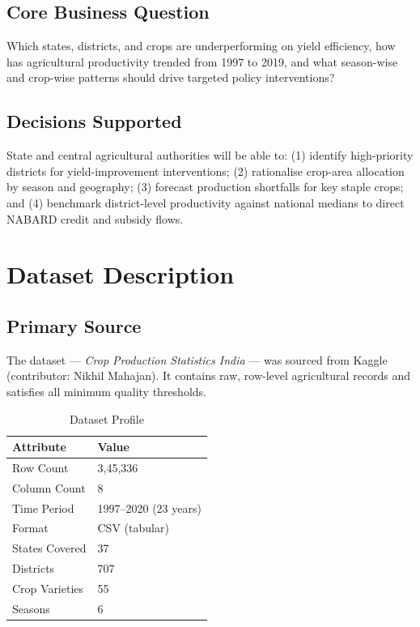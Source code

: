 \documentclass[10pt]{article}
\begin{document}
\subsection{Core Business Question}
Which states, districts, and crops are underperforming on yield efficiency, how has
agricultural productivity trended from 1997 to 2019, and what season-wise and
crop-wise patterns should drive targeted policy interventions?

\subsection{Decisions Supported}
State and central agricultural authorities will be able to: (1) identify high-priority
districts for yield-improvement interventions; (2) rationalise crop-area allocation
by season and geography; (3) forecast production shortfalls for key staple crops;
and (4) benchmark district-level productivity against national medians to direct
NABARD credit and subsidy flows.

\section{Dataset Description}

\subsection{Primary Source}
The dataset — \textit{Crop Production Statistics India} — was sourced from Kaggle
(contributor: Nikhil Mahajan). It contains raw, row-level agricultural records and
satisfies all minimum quality thresholds.

\begin{table}[H]
  \centering
  \caption{Dataset Profile}
  \label{tab:dataset}
  \small
  \begin{tabular}{ll}
    \toprule
    \textbf{Attribute} & \textbf{Value} \\
    \midrule
    Row Count        & 3,45,336 \\
    Column Count     & 8 \\
    Time Period      & 1997–2020 (23 years) \\
    Format           & CSV (tabular) \\
    States Covered   & 37 \\
    Districts        & 707 \\
    Crop Varieties   & 55 \\
    Seasons          & 6 \\
    \bottomrule
  \end{tabular}
\end{table}
\end{document}
